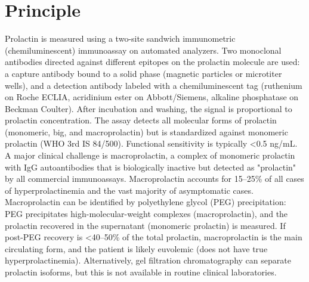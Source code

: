 \section*{Principle}
Prolactin is measured using a two-site sandwich immunometric (chemiluminescent) immunoassay on automated analyzers. Two monoclonal antibodies directed against different epitopes on the prolactin molecule are used: a capture antibody bound to a solid phase (magnetic particles or microtiter wells), and a detection antibody labeled with a chemiluminescent tag (ruthenium on Roche ECLIA, acridinium ester on Abbott/Siemens, alkaline phosphatase on Beckman Coulter). After incubation and washing, the signal is proportional to prolactin concentration. The assay detects all molecular forms of prolactin (monomeric, big, and macroprolactin) but is standardized against monomeric prolactin (WHO 3rd IS 84/500). Functional sensitivity is typically <0.5 ng/mL. A major clinical challenge is macroprolactin, a complex of monomeric prolactin with IgG autoantibodies that is biologically inactive but detected as "prolactin" by all commercial immunoassays. Macroprolactin accounts for 15--25\% of all cases of hyperprolactinemia and the vast majority of asymptomatic cases. Macroprolactin can be identified by polyethylene glycol (PEG) precipitation: PEG precipitates high-molecular-weight complexes (macroprolactin), and the prolactin recovered in the supernatant (monomeric prolactin) is measured. If post-PEG recovery is <40--50\% of the total prolactin, macroprolactin is the main circulating form, and the patient is likely euvolemic (does not have true hyperprolactinemia). Alternatively, gel filtration chromatography can separate prolactin isoforms, but this is not available in routine clinical laboratories.

